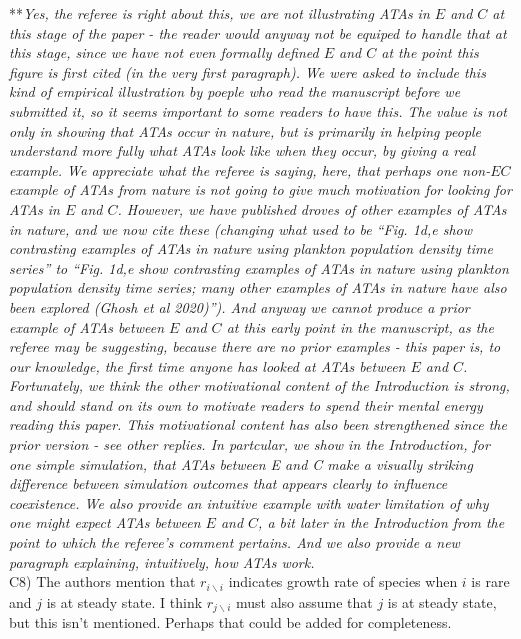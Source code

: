 \documentclass[letterpaper,11pt]{article}
\newcommand{\bs}{\backslash}
\begin{document}
\noindent ***\emph{Yes, the referee is right about this, we are not illustrating ATAs in $E$ and $C$ at this stage of the 
paper - the reader would anyway not be equiped to handle that at this stage, since we have not even formally defined 
$E$ and $C$ at the point this figure is first cited (in the very first paragraph). 
We were asked to include this kind of empirical illustration 
by poeple who read the manuscript before we submitted it, so it seems important to some readers to have this. 
The value is not only in showing that ATAs occur in nature, but is primarily  
in helping people understand more fully what ATAs look like when they occur, by giving a real example. 
We appreciate what the referee is saying,
here, that perhaps one non-$EC$ example of ATAs from nature is not going
to give much motivation for looking for ATAs in $E$ and $C$. However, we have published droves of other examples of
ATAs in nature, and we now cite these (changing what used to be ``Fig. 1d,e show contrasting examples of ATAs in nature
using plankton population density time series'' to ``Fig. 1d,e show contrasting examples of ATAs in nature
using plankton population density time series; many other examples of ATAs in nature have also been explored (Ghosh et al 2020)''). 
And anyway we cannot produce a prior example of ATAs between $E$ and $C$ at this early point in the manuscript, 
as the referee may be suggesting, because there are no prior examples - this paper is, to our
knowledge, the first time anyone has looked at ATAs between $E$ and $C$. Fortunately, we think the other motivational
content of the Introduction is strong, and should stand on its own to motivate readers to spend their mental 
energy reading this paper. This motivational content has also been strengthened since the prior version - see other replies. 
In partcular, we show in the Introduction, for one simple simulation, that ATAs between E and
C make a visually striking difference between simulation outcomes that appears clearly to influence coexistence.
We also provide an intuitive example with water limitation of why one might expect ATAs between $E$ and $C$, 
a bit later in the Introduction from the point to which the referee's comment pertains.
And we also provide a new paragraph explaining, intuitively, how ATAs work. } \\

\noindent C8) The authors mention that $r_{i \bs i}$ indicates growth rate of species when $i$ is rare and $j$ is at steady state.  I think $r_{j \bs i}$ must also assume that $j$ is at steady state, but this isn't mentioned. Perhaps that could be added for completeness. \\
\end{document}
